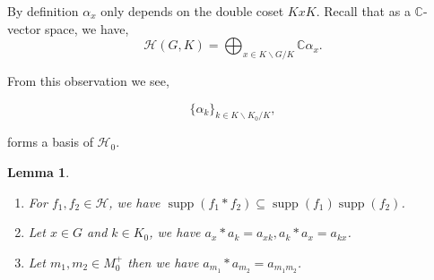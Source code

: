 \documentclass[8pt]{article}
\newtheorem{lemma}{Lemma}[section]
\DeclareMathOperator{\supp}{supp}
\newcommand{\C}[0]{\mathbb{C}}
\newcommand{\hecke}[0]{\mathscr{H}}
\begin{document}
By definition $\alpha_x$ only depends on the double coset $KxK$. Recall that as a $\C$-vector space, we have,
\begin{equation*}
  \hecke(G,K) = \bigoplus_{x\in K\backslash G/K}\C\alpha_x.
\end{equation*}

From this observation we see,

\begin{equation*}
  \{\alpha_k\}_{k\in K\backslash K_0/K},
\end{equation*}

forms a basis of $\hecke_0$.

\begin{lemma}$\:$
  \label{lemma_35}
  \begin{enumerate}[1).]
    \item For $f_1,f_2\in\hecke$, we have $\supp(f_1\ast f_2)\subseteq \supp(f_1)\supp(f_2)$.
    \item Let $x\in G$ and $k\in K_0$, we have $a_x\ast a_k = a_{xk},a_k\ast a_x = a_{kx}$.
    \item Let $m_1,m_2\in M_0^+$ then we have $a_{m_1}\ast a_{m_2} = a_{m_1m_2}$.
  \end{enumerate}
\end{lemma}
\end{document}
